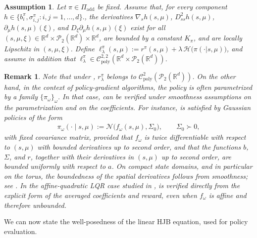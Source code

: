 \documentclass[a4paper, 10pt, english, reqno]{amsart}
\newtheorem{assumptions}[theorem]{Assumption}
\newtheorem{remark}[theorem]{Remark}
\begin{document}
\begin{assumptions}\label{ass:_mkv_regularity}
Let $\pi\in\Pi_{\mathrm{add}}$ be fixed. Assume that, for every component
$h\in\{b_i^\pi,\sigma_{i,j}^\pi:i,j=1,\dots,d\}.$, the
derivatives $\nabla_s h(s,\mu)$, $D_{ss}^2h(s,\mu)$,
$\partial_\mu h(s,\mu)(\xi)$, and
$D_\xi\partial_\mu h(s,\mu)(\xi)$ exist for all
$(s,\mu,\xi)\in\mathbb R^d\times\mathcal P_2(\mathbb R^d)\times\mathbb R^d$,
are bounded by a constant $K_\pi$, and are locally Lipschitz in
$(s,\mu,\xi)$. Define $\ell^\pi_\lambda(s,\mu):=r^\pi(s,\mu)+\lambda\,\mathcal H\bigl(\pi(\cdot|s,\mu)\bigr)$, and assume in addition that
$\ell^\pi_\lambda\in
\mathcal C^{2,2}_{\mathrm{poly}}(\mathbb R^d\times\mathcal P_2(\mathbb R^d))$.
\end{assumptions}
\begin{remark}
Note that under , $r^\pi_\lambda$ belongs to $\mathcal C^2_{\mathrm{poly}}(\mathcal P_2(\mathbb R^d))$. On the other hand, in the context of policy-gradient algorithms, the policy is often parametrized by a family $\{\pi_\omega\}_\omega$. In that case,  can be verified under smoothness assumptions on the parametrization and on the coefficients. For instance,  is satisfied by Gaussian policies of the form
\begin{align}\label{eq:genera_gaussina_parametrization}
    \pi_\omega(\cdot\mid s,\mu)
:=
\mathcal N\bigl(f_\omega(s,\mu),\Sigma_0\bigr),\qquad \Sigma_0 \succ 0,
\end{align}
with fixed covariance matrix, provided that $f_\omega$ is twice differentiable with respect to $(s,\mu)$ with bounded derivatives up to second order, and that the functions $b$, $\Sigma$, and $r$, together with their derivatives in $(s,\mu)$ up to second order, are bounded uniformly with respect to $a$. On compact state domains, and in particular on the torus, the boundedness of the spatial derivatives follows from smoothness; see . In the affine-quadratic LQR case studied in ,  is verified directly from the explicit form of the averaged coefficients and reward, even when $f_\omega$ is affine and therefore unbounded.
\end{remark}

We can now state the well-posedness of the linear HJB equation, used for policy evaluation. 
\end{document}
